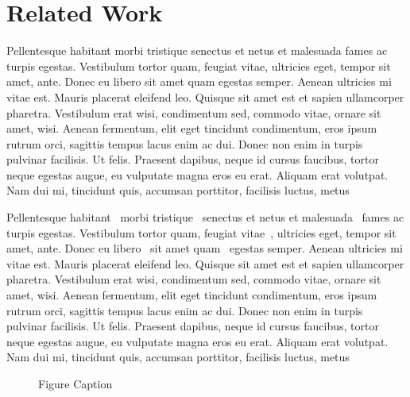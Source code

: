
\section{Related Work}\label{sec:related}
Pellentesque habitant morbi tristique senectus et netus et malesuada fames ac turpis egestas. Vestibulum tortor quam, feugiat vitae, ultricies eget, tempor sit amet, ante. Donec eu libero sit amet quam egestas semper. Aenean ultricies mi vitae est. Mauris placerat eleifend leo. Quisque sit amet est et sapien ullamcorper pharetra. Vestibulum erat wisi, condimentum sed, commodo vitae, ornare sit amet, wisi. Aenean fermentum, elit eget tincidunt condimentum, eros ipsum rutrum orci, sagittis tempus lacus enim ac dui. Donec non enim in turpis pulvinar facilisis. Ut felis. Praesent dapibus, neque id cursus faucibus, tortor neque egestas augue, eu vulputate magna eros eu erat. Aliquam erat volutpat. Nam dui mi, tincidunt quis, accumsan porttitor, facilisis luctus, metus

Pellentesque habitant~\cite{8094140, 7157818, 8416424, 8406200} morbi tristique~\cite{8094140} senectus et netus et malesuada~\cite{7157818} fames ac turpis egestas. Vestibulum\cite{181294} tortor quam, feugiat vitae~\cite{8416424}, ultricies eget\cite{8406200}, tempor sit amet, ante\cite{Chen-ASD}. Donec eu libero~\cite{7876241,181294} sit amet quam~\cite{7876241} egestas semper. Aenean\cite{7979979} ultricies mi vitae est. Mauris placerat eleifend leo. Quisque\cite{7899588} sit amet est et sapien ullamcorper\cite{Mu-AAAS} pharetra. Vestibulum erat wisi, condimentum sed\cite{7899588}, commodo vitae, ornare sit amet, wisi. Aenean fermentum, elit eget tincidunt condimentum, eros ipsum rutrum orci, sagittis tempus lacus enim ac dui. Donec non enim in turpis pulvinar facilisis. Ut felis. Praesent dapibus, neque id cursus faucibus, tortor neque egestas augue, eu vulputate magna eros eu erat. Aliquam erat volutpat. Nam dui mi, tincidunt quis, accumsan porttitor, facilisis luctus, metus

\begin{figure}[t!]
	\centering
	\caption{Figure Caption}
	\label{fig:fig2}
\end{figure}